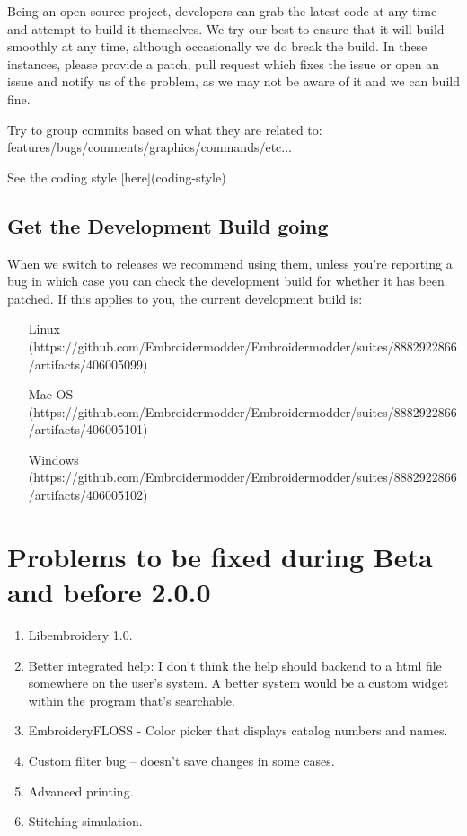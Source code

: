 Being an open source project, developers can grab the latest code at any time
and attempt to build it themselves. We try our best to ensure that it will build smoothly
at any time, although occasionally we do break the build. In these instances,
please provide a patch, pull request which fixes the issue or open an issue and
notify us of the problem, as we may not be aware of it and we can build fine.

Try to group commits based on what they are related to: features/bugs/comments/graphics/commands/etc...

See the coding style [here](coding-style)

\subsection{Get the Development Build going}

When we switch to releases we recommend using them, unless you're reporting a bug in which case you can check the development build for whether it has been patched. If this applies to you, the current development build is:

\begin{itemize}
\item [Linux](https://github.com/Embroidermodder/Embroidermodder/suites/8882922866/artifacts/406005099)
\item [Mac OS](https://github.com/Embroidermodder/Embroidermodder/suites/8882922866/artifacts/406005101)
\item [Windows](https://github.com/Embroidermodder/Embroidermodder/suites/8882922866/artifacts/406005102)
\end{itemize}

\section{Problems to be fixed during Beta and before 2.0.0}

\begin{enumerate}
\item Libembroidery 1.0.
\item Better integrated help: I don't think the help should backend to a html file somewhere on the user's system. A better system would be a custom widget within the program that's searchable.
\item EmbroideryFLOSS - Color picker that displays catalog numbers and names.
\item Custom filter bug -- doesn't save changes in some cases.
\item Advanced printing.
\item Stitching simulation.
\end{enumerate}

